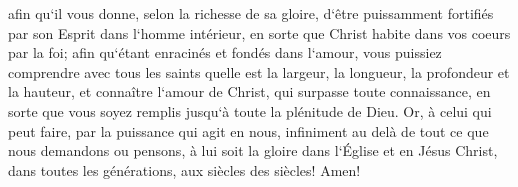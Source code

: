 \verse afin qu`il vous donne, selon la richesse de sa gloire, d`être puissamment fortifiés par son Esprit dans l`homme intérieur, 
\verse en sorte que Christ habite dans vos coeurs par la foi; afin qu`étant enracinés et fondés dans l`amour, 
\verse vous puissiez comprendre avec tous les saints quelle est la largeur, la longueur, la profondeur et la hauteur, 
\verse et connaître l`amour de Christ, qui surpasse toute connaissance, en sorte que vous soyez remplis jusqu`à toute la plénitude de Dieu. 
\verse Or, à celui qui peut faire, par la puissance qui agit en nous, infiniment au delà de tout ce que nous demandons ou pensons, 
\verse à lui soit la gloire dans l`Église et en Jésus Christ, dans toutes les générations, aux siècles des siècles! Amen! 

